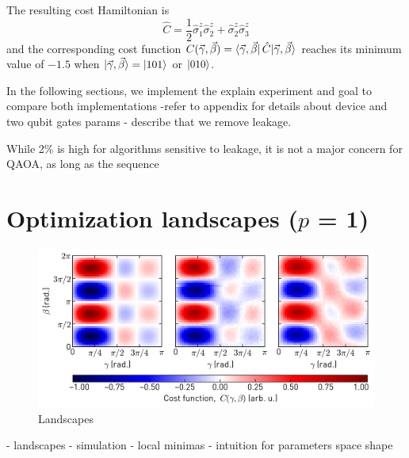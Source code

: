 The resulting cost Hamiltonian is
\begin{equation}
    \hat C = \frac{1}{2}\hat\sigma_1^z\hat\sigma_2^z + \hat\sigma_2^z\hat\sigma_3^z
\end{equation}
and the corresponding cost function $C(\vec\gamma, \vec\beta) = \bra{\vec\gamma, \vec\beta} \hat C |\vec{\gamma}, \vec{\beta}\rangle{}$ reaches its minimum value of $-1.5$ when $|\vec{\gamma}, \vec{\beta}\rangle{} = \ket{101}$ or $\ket{010}$.

In the following sections, we implement the 
explain experiment and goal to compare both implementations
-refer to appendix for details about device and two qubit gates params
- describe that we remove leakage.

While 2\% is high for algorithms sensitive to leakage, it is not a major concern for QAOA, as long as the sequence

\section{Optimization landscapes ($p$ = 1)}
\begin{figure}[ht]
    \centering
    \includegraphics[width=\textwidth]{chapters/qaoa/figs/qaoa_landscapes_20200129_125251.png}
    \caption{Landscapes}
    \label{fig:qaoa_landscapes}
\end{figure}
- landscapes
- simulation
- local minimas
- intuition for parameters space shape

